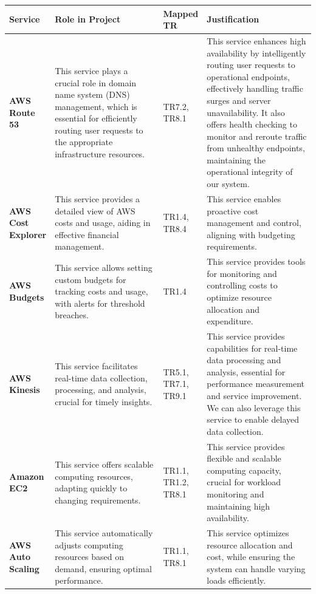 \documentclass{article}
\begin{document}
\begin{table}[H]
    \centering
    \def\arraystretch{1.5}
    \begin{tabular}{|p{0.1\linewidth}| p{0.4\linewidth} | p{0.1\linewidth} | p{0.4\linewidth} |} \hline 
        \textbf{Service}&  \textbf{Role in Project}&  \textbf{Mapped TR}& \textbf{Justification}\\ \hline 
         \textbf{AWS Route 53 \cite{route53}} &  This service  plays a crucial role in domain name system (DNS) management, which is essential for efficiently routing user requests to the appropriate infrastructure resources.& TR7.2, TR8.1 & This service enhances high availability by intelligently routing user requests to operational endpoints, effectively handling traffic surges and server unavailability. It also offers health checking to monitor and reroute traffic from unhealthy endpoints, maintaining the operational integrity of our system.\\ \hline 
         \textbf{AWS Cost Explorer \cite{costexplore}} &  This service provides a detailed view of AWS costs and usage, aiding in effective financial management.& TR1.4, TR8.4 & This service enables proactive cost management and control, aligning with budgeting requirements.\\ \hline 
         \textbf{AWS Budgets \cite{budgets}} &  This service allows setting custom budgets for tracking costs and usage, with alerts for threshold breaches.& TR1.4 & This service provides tools for monitoring and controlling costs to optimize resource allocation and expenditure.\\ \hline 
         
         \textbf{AWS Kinesis \cite{kinesis}} &  This service facilitates real-time data collection, processing, and analysis, crucial for timely insights. & TR5.1, TR7.1, TR9.1 & This service provides capabilities for real-time data processing and analysis, essential for performance measurement and service improvement. We can also leverage this service to enable delayed data collection.\\ \hline 
         
         \textbf{Amazon EC2 \cite{ec2}} &  This service offers scalable computing resources, adapting quickly to changing requirements.& TR1.1, TR1.2, TR8.1 & This service provides flexible and scalable computing capacity, crucial for workload monitoring and maintaining high availability.\\ \hline 
         
        \textbf{AWS Auto Scaling \cite{autoscale}} &  This service automatically adjusts computing resources based on demand, ensuring optimal performance.& TR1.1, TR8.1  & This service optimizes resource allocation and cost, while ensuring the system can handle varying loads efficiently.\\ \hline 
         

\end{tabular}
\end{table}
\end{document}

